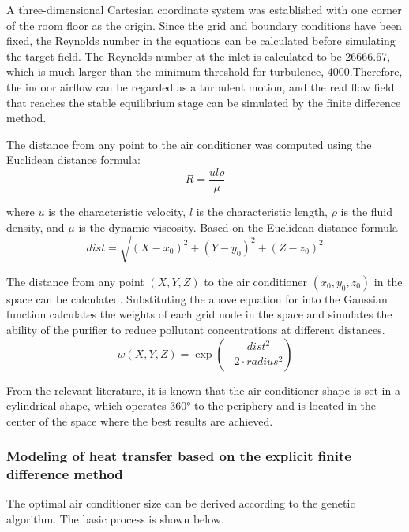 \documentclass{apmcmthesis}
\begin{document}
A three-dimensional Cartesian coordinate system was established with one corner of the room floor as the origin. Since the grid and boundary conditions have been fixed, the Reynolds number in the equations can be calculated before simulating the target field. The Reynolds number at the inlet is calculated to be 26666.67, which is much larger than the minimum threshold for turbulence, 4000.Therefore, the indoor airflow can be regarded as a turbulent motion, and the real flow field that reaches the stable equilibrium stage can be simulated by the finite difference method.


The distance from any point to the air conditioner was computed using the Euclidean distance formula:
\begin{equation}
	R = \frac{{ul\rho }}{\mu }
\end{equation}

where $u$ is the characteristic velocity, $l$ is the characteristic length, $\rho $ is the fluid density, and $\mu $   is the dynamic viscosity.
Based on the Euclidean distance formula
\begin{equation}
dist = \sqrt {{{\left( {X - {x_0}} \right)}^2} + {{\left( {Y - {y_0}} \right)}^2} + {{\left( {Z - {z_0}} \right)}^2}} 
\end{equation}

The distance from any point $\left( {X,Y,Z} \right)$ to the air conditioner $\left( {{x_0},{y_0},{z_0}} \right)$ in the space can be calculated. Substituting the above equation for  into the Gaussian function calculates the weights of each grid node in the space and simulates the ability of the purifier to reduce pollutant concentrations at different distances.
\begin{equation}
	w\left( {X,Y,Z} \right) = \exp \left( { - \frac{{dis{t^2}}}{{2 \cdot radiu{s^2}}}} \right)
\end{equation}

From the relevant literature\cite{olszewska2024}, it is known that the air conditioner shape is set in a cylindrical shape, which operates 360° to the periphery and is located in the center of the space where the best results are achieved.

\subsubsection{Modeling of heat transfer based on the explicit finite difference method}
The optimal air conditioner size can be derived according to the genetic algorithm. The basic process is shown below.
\end{document}
